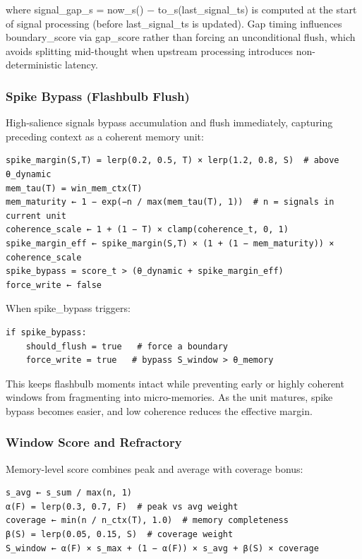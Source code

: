 \documentclass[
  letterpaper,
  DIV=11,
  numbers=noendperiod]{scrartcl}
\begin{document}
where signal\_gap\_s = now\_s() − to\_s(last\_signal\_ts) is computed at
the start of signal processing (before last\_signal\_ts is updated). Gap
timing influences boundary\_score via gap\_score rather than forcing an
unconditional flush, which avoids splitting mid-thought when upstream
processing introduces non-deterministic latency.

\subsubsection{Spike Bypass (Flashbulb
Flush)}\label{spike-bypass-flashbulb-flush}

High-salience signals bypass accumulation and flush immediately,
capturing preceding context as a coherent memory unit:

\begin{verbatim}
spike_margin(S,T) = lerp(0.2, 0.5, T) × lerp(1.2, 0.8, S)  # above θ_dynamic
mem_tau(T) = win_mem_ctx(T)
mem_maturity ← 1 − exp(−n / max(mem_tau(T), 1))  # n = signals in current unit
coherence_scale ← 1 + (1 − T) × clamp(coherence_t, 0, 1)
spike_margin_eff ← spike_margin(S,T) × (1 + (1 − mem_maturity)) × coherence_scale
spike_bypass = score_t > (θ_dynamic + spike_margin_eff)
force_write ← false
\end{verbatim}

When spike\_bypass triggers:

\begin{verbatim}
if spike_bypass:
    should_flush = true   # force a boundary
    force_write = true   # bypass S_window > θ_memory
\end{verbatim}

This keeps flashbulb moments intact while preventing early or highly
coherent windows from fragmenting into micro-memories. As the unit
matures, spike bypass becomes easier, and low coherence reduces the
effective margin.

\subsubsection{Window Score and
Refractory}\label{window-score-and-refractory}

Memory-level score combines peak and average with coverage bonus:

\begin{verbatim}
s_avg ← s_sum / max(n, 1)
α(F) = lerp(0.3, 0.7, F)  # peak vs avg weight
coverage ← min(n / n_ctx(T), 1.0)  # memory completeness
β(S) = lerp(0.05, 0.15, S)  # coverage weight
S_window ← α(F) × s_max + (1 − α(F)) × s_avg + β(S) × coverage
\end{verbatim}
\end{document}
